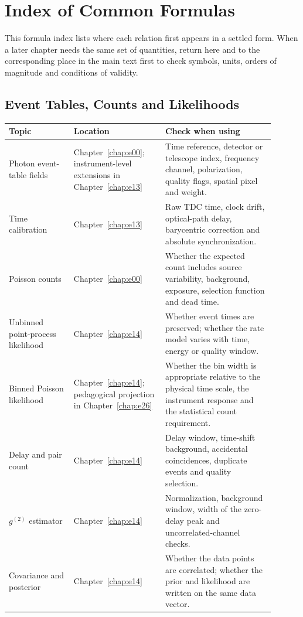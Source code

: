 \chapter{Index of Common Formulas}
\label{app:a}

This formula index lists where each relation first appears in a settled form. When a later chapter needs the same set of quantities, return here and to the corresponding place in the main text first to check symbols, units, orders of magnitude and conditions of validity.

\section{Event Tables, Counts and Likelihoods}
\label{appsec:a-observables}

\begin{longtable}{p{0.22\linewidth}p{0.31\linewidth}p{0.37\linewidth}}
\toprule
Topic & Location & Check when using \\
\midrule
Photon event-table fields & Chapter~\ref{chap:e00}; instrument-level extensions in Chapter~\ref{chap:e13} & Time reference, detector or telescope index, frequency channel, polarization, quality flags, spatial pixel and weight. \\
Time calibration & Chapter~\ref{chap:e13} & Raw TDC time, clock drift, optical-path delay, barycentric correction and absolute synchronization. \\
Poisson counts & Chapter~\ref{chap:e00} & Whether the expected count includes source variability, background, exposure, selection function and dead time. \\
Unbinned point-process likelihood & Chapter~\ref{chap:e14} & Whether event times are preserved; whether the rate model varies with time, energy or quality window. \\
Binned Poisson likelihood & Chapter~\ref{chap:e14}; pedagogical projection in Chapter~\ref{chap:e26} & Whether the bin width is appropriate relative to the physical time scale, the instrument response and the statistical count requirement. \\
Delay and pair count & Chapter~\ref{chap:e14} & Delay window, time-shift background, accidental coincidences, duplicate events and quality selection. \\
\(g^{(2)}\) estimator & Chapter~\ref{chap:e14} & Normalization, background window, width of the zero-delay peak and uncorrelated-channel checks. \\
Covariance and posterior & Chapter~\ref{chap:e14} & Whether the data points are correlated; whether the prior and likelihood are written on the same data vector. \\
\bottomrule
\end{longtable}

